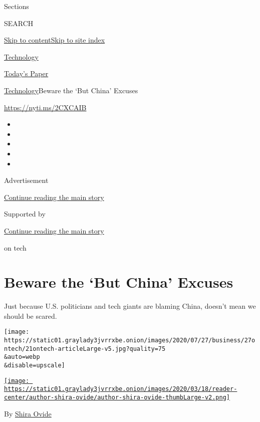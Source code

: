 Sections

SEARCH

\protect\hyperlink{site-content}{Skip to
content}\protect\hyperlink{site-index}{Skip to site index}

\href{https://www.nytimes3xbfgragh.onion/section/technology}{Technology}

\href{https://myaccount.nytimes3xbfgragh.onion/auth/login?response_type=cookie\&client_id=vi}{}

\href{https://www.nytimes3xbfgragh.onion/section/todayspaper}{Today's
Paper}

\href{/section/technology}{Technology}\textbar{}Beware the `But China'
Excuses

\href{https://nyti.ms/2CXCAIB}{https://nyti.ms/2CXCAIB}

\begin{itemize}
\item
\item
\item
\item
\item
\end{itemize}

Advertisement

\protect\hyperlink{after-top}{Continue reading the main story}

Supported by

\protect\hyperlink{after-sponsor}{Continue reading the main story}

on tech

\hypertarget{beware-the-but-china-excuses}{%
\section{Beware the `But China'
Excuses}\label{beware-the-but-china-excuses}}

Just because U.S. politicians and tech giants are blaming China, doesn't
mean we should be scared.

\texttt{[image: https://static01.graylady3jvrrxbe.onion/images/2020/07/27/business/27ontech/21ontech-articleLarge-v5.jpg?quality=75\\\&auto=webp\\\&disable=upscale]}

\href{https://www.nytimes3xbfgragh.onion/by/shira-ovide}{\texttt{[image: https://static01.graylady3jvrrxbe.onion/images/2020/03/18/reader-center/author-shira-ovide/author-shira-ovide-thumbLarge-v2.png]}}

By \href{https://www.nytimes3xbfgragh.onion/by/shira-ovide}{Shira Ovide}


